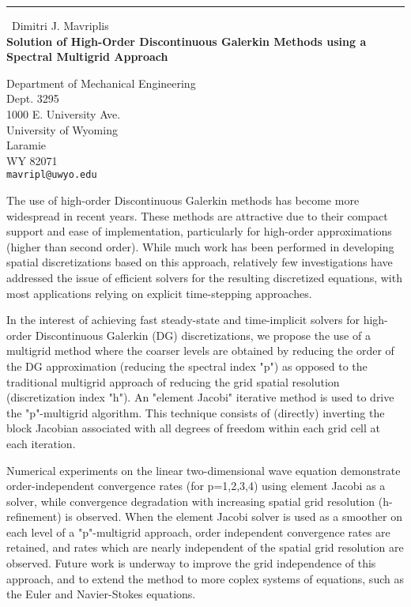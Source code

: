 \documentclass{report}
\begin{document}
\begin{center}
\rule{6in}{1pt} \
{\large Dimitri J. Mavriplis \\
{\bf Solution of High-Order Discontinuous Galerkin Methods using a Spectral Multigrid Approach}}

Department of Mechanical Engineering \\ Dept. 3295  \\ 1000 E. University Ave. \\ University of Wyoming \\ Laramie \\ WY 82071
\\
{\tt mavripl@uwyo.edu}\end{center}

The use of high-order Discontinuous Galerkin methods has become
more widespread in recent years.
These methods are attractive due to their compact support
and ease of implementation, particularly for high-order
approximations (higher than second order).
While much work has been performed in developing spatial discretizations
based on this approach, relatively few investigations have addressed the
issue of efficient
solvers for the resulting discretized equations, with most applications
relying on explicit time-stepping approaches.

In the interest of achieving fast steady-state and time-implicit
solvers for high-order Discontinuous Galerkin (DG) discretizations,
we propose the use of a multigrid method where the coarser levels
are obtained by reducing the order of the DG approximation
(reducing the spectral index "p") as opposed to the traditional multigrid
approach of reducing the grid spatial resolution (discretization index
"h").
An "element Jacobi" iterative method is used to drive the "p"-multigrid
algorithm. This technique consists of (directly) inverting the block
Jacobian associated with all degrees of freedom within each grid cell at
each iteration.

Numerical experiments on the linear two-dimensional wave equation
demonstrate order-independent convergence rates (for p=1,2,3,4)
using element Jacobi as a solver, while convergence degradation
with increasing spatial grid resolution (h-refinement) is observed.
When the element Jacobi solver is used as a smoother on each level
of a "p"-multigrid approach, order independent convergence rates
are retained, and rates which are nearly independent of the spatial
grid resolution are observed.
Future work is underway to improve the grid independence of this
approach, and to extend the method to more coplex systems
of equations, such as the Euler and Navier-Stokes equations.
\end{document}
